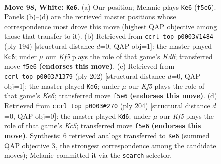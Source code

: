 \documentclass[11pt]{article}
\begin{document}
\clearpage

\begin{figure}[p]\centering
\begin{subfigure}{0.46\textwidth}\centering
\resizebox{\linewidth}{!}{%
\newchessgame
\chessboard[
  setfen={1Q6/6k1/8/5K2/8/8/8/8 w - - 7 98},
  showmover=false,
  pgfstyle=straightmove, color=movearrow, markmove={f5-e6}
]}
\caption{}
\end{subfigure}\hfill
\begin{subfigure}{0.46\textwidth}\centering
\resizebox{\linewidth}{!}{%
\newchessgame
\chessboard[
  setfen={1k6/8/3K4/Q7/8/8/8/8 w - - 9 98},
  showmover=false,
  pgfstyle=straightmove, color=movearrow, markmove={d6-c6}
]}
\caption{}
\end{subfigure}
\\[4pt]
\begin{subfigure}{0.46\textwidth}\centering
\resizebox{\linewidth}{!}{%
\newchessgame
\chessboard[
  setfen={2k5/8/4K3/1Q6/8/8/8/8 w - - 11 102},
  showmover=false,
  pgfstyle=straightmove, color=movearrow, markmove={e6-d6}
]}
\caption{}
\end{subfigure}\hfill
\begin{subfigure}{0.46\textwidth}\centering
\resizebox{\linewidth}{!}{%
\newchessgame
\chessboard[
  setfen={3k4/6Q1/8/2K5/8/8/8/8 w - - 7 103},
  showmover=false,
  pgfstyle=straightmove, color=movearrow, markmove={c5-d6}
]}
\caption{}
\end{subfigure}
\caption{\textbf{Move 98, White: \texttt{Ke6}.} (a) Our position; Melanie plays \texttt{Ke6} (\texttt{f5e6}). Panels (b)--(d) are the retrieved master positions whose correspondence most drove this move (highest QAP objective among those that transfer to it). (b) Retrieved from \texttt{ccrl\_top\_p0003\#1484} (ply 194) [structural distance $d$=0, QAP obj=1]: the master played \texttt{Kc6}; under $\mu$ our \emph{Kf5} plays the role of that game's \emph{Kd6}; transferred move \texttt{f5e6} \textbf{(endorses this move)}. (c) Retrieved from \texttt{ccrl\_top\_p0003\#1379} (ply 202) [structural distance $d$=0, QAP obj=1]: the master played \texttt{Kd6}; under $\mu$ our \emph{Kf5} plays the role of that game's \emph{Ke6}; transferred move \texttt{f5e6} \textbf{(endorses this move)}. (d) Retrieved from \texttt{ccrl\_top\_p0003\#270} (ply 204) [structural distance $d$=0, QAP obj=0]: the master played \texttt{Kd6}; under $\mu$ our \emph{Kf5} plays the role of that game's \emph{Kc5}; transferred move \texttt{f5e6} \textbf{(endorses this move)}. Synthesis: 6 retrieved analogs transferred to \texttt{Ke6} (summed QAP objective 3, the strongest correspondence among the candidate moves); Melanie committed it via the \texttt{search} selector.}
\label{fig:thought-m194}
\end{figure}
\end{document}

